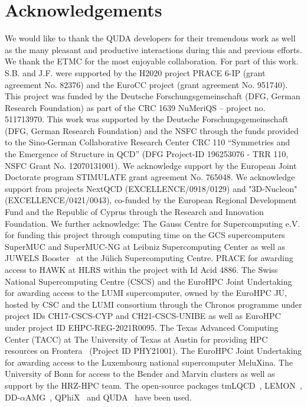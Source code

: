 \documentclass[a4paper,11pt]{article}
\begin{document}
\section{Acknowledgements}
 {
  \small
  We would like to thank the QUDA developers for their tremendous work as well as the many pleasant and productive interactions during this and previous efforts.
  We thank the ETMC for the most enjoyable collaboration.
  For part of this work. S.B. and J.F. were supported by the H2020 project PRACE 6-IP (grant agreement No. 82376) and the EuroCC project (grant agreement No. 951740).
  This project was funded by the Deutsche Forschungsgemeinschaft (DFG, German Research Foundation) as part of the CRC 1639 NuMeriQS – project no. 511713970.
  This work was supported by the Deutsche Forschungsgemeinschaft (DFG, German Research Foundation) and the NSFC through the funds provided to the Sino-German Collaborative Research Center CRC 110 “Symmetries and the Emergence of Structure in QCD” (DFG Project-ID 196253076 - TRR 110, NSFC Grant No. 12070131001).
  We acknowledge support by the European Joint Doctorate program STIMULATE grant agreement No. 765048.
  We acknowledge support from projects NextQCD (EXCELLENCE/0918/0129) and "3D-Nucleon" (EXCELLENCE/0421/0043), co-funded by the European Regional Development Fund and the Republic of Cyprus through the Research and Innovation Foundation.
  We further acknowledge: The Gauss Centre for Supercomputing e.V. for funding this project through computing time on the GCS supercomputers SuperMUC and SuperMUC-NG at Leibniz Supercomputing Center as well as JUWELS Booster~\cite{JUWELS,BOOSTER} at the Jülich Supercomputing Centre.
  PRACE for awarding access to HAWK at HLRS within the project with Id Acid 4886.
  The Swiss National Supercomputing Centre (CSCS) and the EuroHPC Joint Undertaking for awarding access to the LUMI supercomputer, owned by the EuroHPC JU, hosted by CSC and the LUMI consortium through the Chronos programme under project IDs CH17-CSCS-CYP and CH21-CSCS-UNIBE as well as EuroHPC under project ID EHPC-REG-2021R0095.
  The Texas Advanced Computing Center (TACC) at The University of Texas at Austin for providing HPC resources on Frontera~\cite{FRONTERA} (Project ID PHY21001).
  The EuroHPC Joint Undertaking for awarding access to the Luxembourg national supercomputer MeluXina.
  The University of Bonn for access to the Bender and Marvin clusters as well as support by the HRZ-HPC team.
  The open-source packages tmLQCD~\cite{Jansen:2009xp,Abdel-Rehim:2013wba,Deuzeman:2013xaa,Kostrzewa:2022hsv,tmLQCD_mg_tune}, LEMON~\cite{Deuzeman:2011wz}, DD-$\alpha$AMG~\cite{Frommer:2013fsa,Alexandrou:2016izb,Bacchio:2017pcp,Alexandrou:2018wiv}, QPhiX~\cite{qphix13,qphix14,qphix16,Schrock:2015gik} and QUDA~\cite{Clark:2009wm,Babich:2011np,Clark:2016rdz} have been used.
 }


{\footnotesize
  
}
\end{document}
